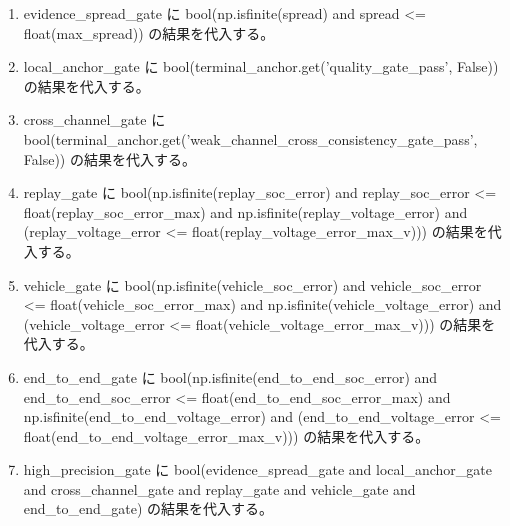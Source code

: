 \documentclass[a4paper,11pt]{article}
\begin{document}
\begin{enumerate}[leftmargin=1.8em]
\item evidence\_spread\_gate に bool(np.isfinite(spread) and spread <= float(max\_spread)) の結果を代入する。
\item local\_anchor\_gate に bool(terminal\_anchor.get('quality\_gate\_pass', False)) の結果を代入する。
\item cross\_channel\_gate に bool(terminal\_anchor.get('weak\_channel\_cross\_consistency\_gate\_pass', False)) の結果を代入する。
\item replay\_gate に bool(np.isfinite(replay\_soc\_error) and replay\_soc\_error <= float(replay\_soc\_error\_max) and np.isfinite(replay\_voltage\_error) and (replay\_voltage\_error <= float(replay\_voltage\_error\_max\_v))) の結果を代入する。
\item vehicle\_gate に bool(np.isfinite(vehicle\_soc\_error) and vehicle\_soc\_error <= float(vehicle\_soc\_error\_max) and np.isfinite(vehicle\_voltage\_error) and (vehicle\_voltage\_error <= float(vehicle\_voltage\_error\_max\_v))) の結果を代入する。
\item end\_to\_end\_gate に bool(np.isfinite(end\_to\_end\_soc\_error) and end\_to\_end\_soc\_error <= float(end\_to\_end\_soc\_error\_max) and np.isfinite(end\_to\_end\_voltage\_error) and (end\_to\_end\_voltage\_error <= float(end\_to\_end\_voltage\_error\_max\_v))) の結果を代入する。
\item high\_precision\_gate に bool(evidence\_spread\_gate and local\_anchor\_gate and cross\_channel\_gate and replay\_gate and vehicle\_gate and end\_to\_end\_gate) の結果を代入する。

\end{enumerate}
\end{document}
